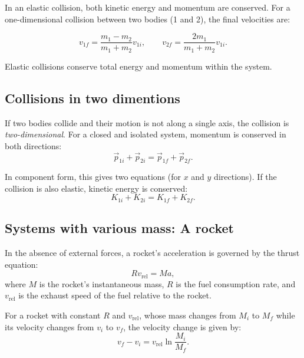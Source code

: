 In an elastic collision, both kinetic energy and momentum are conserved.  
For a one-dimensional collision between two bodies (1 and 2), the final velocities are:

\[
v_{1f} = \frac{m_1 - m_2}{m_1 + m_2} v_{1i}, \qquad
v_{2f} = \frac{2m_1}{m_1 + m_2} v_{1i}.
\]

Elastic collisions conserve total energy and momentum within the system.

\subsection{Collisions in two dimentions}
If two bodies collide and their motion is not along a single axis, the collision is \textit{two-dimensional}.  
For a closed and isolated system, momentum is conserved in both directions:
\[
\vec{p}_{1i} + \vec{p}_{2i} = \vec{p}_{1f} + \vec{p}_{2f}.
\]

In component form, this gives two equations (for \(x\) and \(y\) directions).  
If the collision is also elastic, kinetic energy is conserved:
\[
K_{1i} + K_{2i} = K_{1f} + K_{2f}.
\]

\subsection{Systems with various mass: A rocket}
In the absence of external forces, a rocket’s acceleration is governed by the thrust equation:
\[
R v_{\text{rel}} = M a,
\]
where \(M\) is the rocket’s instantaneous mass, \(R\) is the fuel consumption rate, and \(v_{\text{rel}}\) is the exhaust speed of the fuel relative to the rocket.

For a rocket with constant \(R\) and \(v_{\text{rel}}\), whose mass changes from \(M_i\) to \(M_f\) while its velocity changes from \(v_i\) to \(v_f\), the velocity change is given by:
\[
v_f - v_i = v_{\text{rel}} \ln \frac{M_i}{M_f}.
\]
